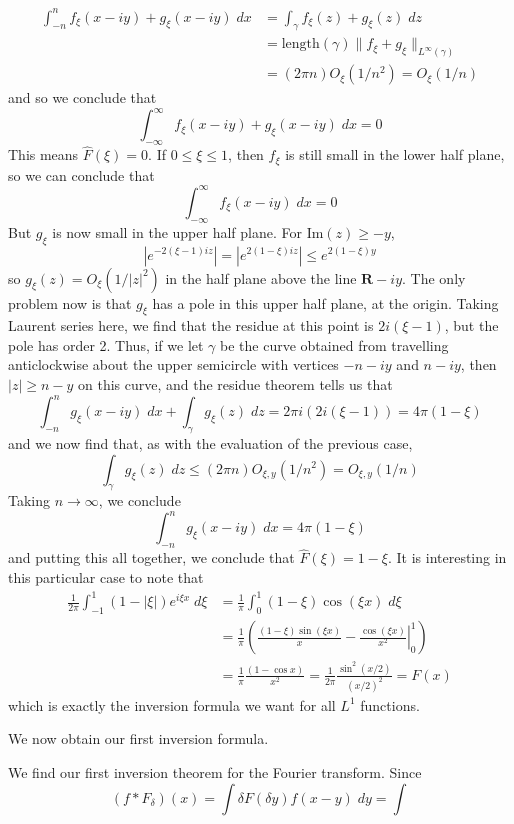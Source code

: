 \begin{example}
\begin{align*}
		\int_{-n}^n f_\xi(x - iy) + g_\xi(x - iy)\; dx &= \int_\gamma f_\xi(z) + g_\xi(z)\; dz\\
		&= \text{length}(\gamma) \| f_\xi + g_\xi \|_{L^\infty(\gamma)}\\
		&= (2 \pi n) O_\xi(1/n^2) = O_\xi(1/n)
	\end{align*}
	and so we conclude that
	\[ \int_{-\infty}^\infty f_\xi(x - iy) + g_\xi(x - iy)\; dx = 0 \]
	This means $\widehat{F}(\xi) = 0$. If $0 \leq \xi \leq 1$, then $f_\xi$ is still small in the lower half plane, so we can conclude that
	\[ \int_{-\infty}^\infty f_\xi(x - iy)\; dx = 0 \]
	But $g_\xi$ is now small in the upper half plane. For $\text{Im}(z) \geq -y$,
	\[ |e^{-2(\xi - 1)iz}| = |e^{2(1 - \xi)iz}| \leq e^{2(1 - \xi)y} \] 
	so $g_\xi(z) = O_\xi(1/|z|^2)$ in the half plane above the line $\mathbf{R} - iy$. The only problem now is that $g_\xi$ has a pole in this upper half plane, at the origin. Taking Laurent series here, we find that the residue at this point is $2i(\xi - 1)$, but the pole has order 2. Thus, if we let $\gamma$ be the curve obtained from travelling anticlockwise about the upper semicircle with vertices $-n - iy$ and $n - iy$, then $|z| \geq n - y$ on this curve, and the residue theorem tells us that
	\[ \int_{-n}^n g_\xi(x - iy)\; dx + \int_\gamma g_\xi(z)\; dz = 2\pi i (2i(\xi - 1)) = 4 \pi (1 - \xi) \]
	and we now find that, as with the evaluation of the previous case,
	\[ \int_\gamma g_\xi(z)\; dz \leq (2 \pi n) O_{\xi,y}(1/n^2) = O_{\xi,y}(1/n) \]
	Taking $n \to \infty$, we conclude
	\[ \int_{-n}^n g_\xi(x - iy)\; dx = 4 \pi (1 - \xi) \]
	and putting this all together, we conclude that $\widehat{F}(\xi) = 1 - \xi$. It is interesting in this particular case to note that
	\begin{align*}
		\frac{1}{2\pi} \int_{-1}^1 (1 - |\xi|) e^{i\xi x}\; d\xi &= \frac{1}{\pi} \int_0^1 (1 - \xi) \cos(\xi x)\; d\xi\\
		&= \frac{1}{\pi} \left( \left. \frac{(1 - \xi) \sin(\xi x)}{x} - \frac{\cos(\xi x)}{x^2} \right|_0^1 \right)\\
		&= \frac{1}{\pi} \frac{(1 - \cos x)}{x^2} = \frac{1}{2\pi} \frac{\sin^2(x/2)}{(x/2)^2} = F(x)
	\end{align*}
	which is exactly the inversion formula we want for all $L^1$ functions.
\end{example}

We now obtain our first inversion formula.

We find our first inversion theorem for the Fourier transform. Since
%
\[ (f * F_\delta)(x) = \int \delta F(\delta y) f(x - y)\; dy = \int  \]


